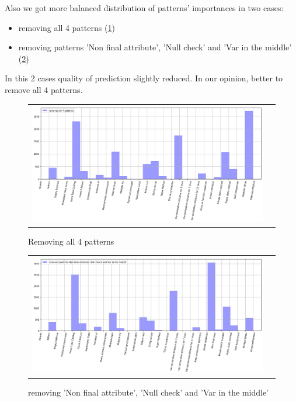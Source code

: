 \documentclass[12pt]{article}
\begin{document}
Also we got more balanced distribution of patterns' importances in two cases:
\begin{itemize}
	\item removing all 4 patterns (\ref{fig:ris2})
	\item removing patterns 'Non final attribute', 'Null check' and 'Var in the middle' (\ref{fig:ris1})
\end{itemize}
In this 2 cases quality of prediction slightly reduced.
In our opinion, better to remove all 4 patterns.
\begin{figure}[h!]\center
	\begin{tabular}{cc}
		\includegraphics[scale=0.25]{2.png}
	\end{tabular}
	\caption{Removing all 4 patterns}
	\label{fig:ris2}
\end{figure}
\begin{figure}[h!]\center
	\begin{tabular}{cc}
		\includegraphics[scale=0.25]{1.png}
	\end{tabular}
	\caption{removing 'Non final attribute', 'Null check' and 'Var in the middle'}
	\label{fig:ris1}
\end{figure}
\end{document}
